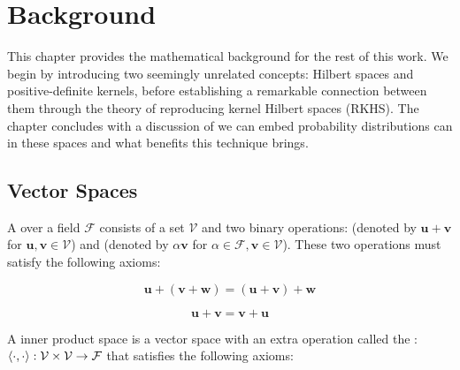 \chapter{Background}

This chapter provides the mathematical background for the rest of this work. We begin by introducing two seemingly unrelated concepts: Hilbert spaces and positive-definite kernels, before establishing a remarkable connection between them through the theory of reproducing kernel Hilbert spaces (RKHS). The chapter concludes with a discussion of we can embed probability distributions can in these spaces and what benefits this technique brings.

\section{Vector Spaces}

\begin{definition}
A  over a field $\mathcal{F}$ consists of a set $\mathcal{V}$ and two binary operations:  (denoted by $\mathbf{u} + \mathbf{v}$ for $\mathbf{u}, \mathbf{v} \in \mathcal{V}$) and  (denoted by $\alpha \mathbf{v}$ for $\alpha \in \mathcal{F}, \mathbf{v} \in \mathcal{V}$). These two operations must satisfy the following axioms:

\begin{axiom}
	\begin{equation}
		\mathbf{u} + (\mathbf{v} + \mathbf{w}) = (\mathbf{u} + \mathbf{v}) + \mathbf{w}
    \end{equation}
\end{axiom}

\begin{axiom}
    \begin{equation}
    	\mathbf{u} + \mathbf{v} = \mathbf{v} + \mathbf{u}
    \end{equation}
\end{axiom}

\end{definition}

\begin{definition}
A inner product space is a vector space with an extra operation called the : $\langle\cdot, \cdot\rangle : \mathcal{V} \times \mathcal{V} \to \mathcal{F}$ that satisfies the following axioms:
\end{definition}

